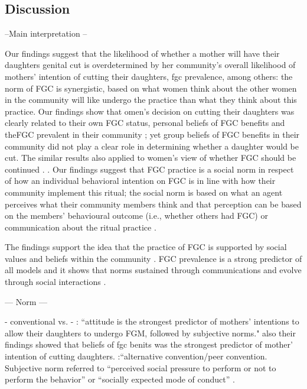 \documentclass[12pt,]{article}
\begin{document}
\subsection{Discussion}\label{Discussion}

--Main interpretation --

Our findings suggest that the likelihood of whether a mother will have their daughters genital cut is overdetermined by her community’s overall likelihood of mothers’ intention of cutting their daughters, fgc prevalence, among others:  the norm of FGC is synergistic, based on what women think about the other women in the community will like undergo the practice than what they think about this practice.  Our findings show that omen’s decision on cutting their daughters was clearly related to their own FGC status, personal beliefs of FGC benefits and theFGC prevalent in their community ; yet group beliefs of FGC benefits in their community did not play a clear role in determining whether a daughter would be cut.  The similar results also applied to women’s view of whether FGC should be continued .  .  Our findings suggest that FGC practice is a social norm in respect of how an individual behavioral intention on FGC is in line with how their community implement this ritual; the social norm is based on what an agent perceives what their community members think and that perception can be based on the members’ behavioural outcome (i.e., whether others had FGC) or communication about the ritual practice \cite{} .

The findings support the idea that the practice of FGC is supported by social values and beliefs within the community \cite{BiccMari15}.  FGC prevalence is a strong predictor of all models and it shows that norms sustained through communications and evolve through social interactions \cite{FishAjze10, RimaLapi15}.  



— Norm —

- conventional \cite{FreyJohn07, Hayf05, KandShel19, Mack96, ShelWand11} vs. 
- \cite{PashPonn16}:  “attitude is the strongest predictor of mothers' intentions to allow their daughters to undergo FGM, followed by subjective norms." also their findings showed that beliefs of fgc benits was the strongest predictor of mother’ intention of cutting daughters.
\cite{ShelWand11}:“alternative convention/peer convention.  Subjective norm referred to “perceived social pressure to perform or not to perform the behavior” or “socially expected mode of conduct”  \cite{Ajze91}. 
\end{document}
